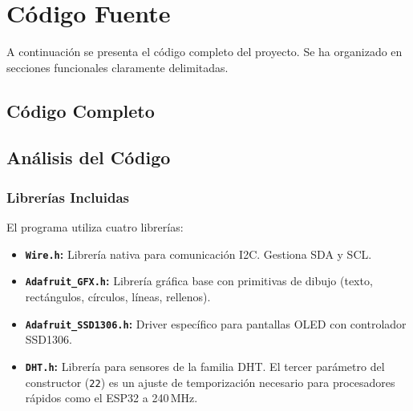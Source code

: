 \documentclass[12pt,a4paper]{article}
\begin{document}
\section{Código Fuente}

A continuación se presenta el código completo del proyecto. Se ha organizado en secciones funcionales claramente delimitadas.

\subsection{Código Completo}


\subsection{Análisis del Código}

\subsubsection*{Librerías Incluidas}
El programa utiliza cuatro librerías:
\begin{itemize}
    \item \textbf{\texttt{Wire.h}:} Librería nativa para comunicación I2C. Gestiona SDA y SCL.
    \item \textbf{\texttt{Adafruit\_GFX.h}:} Librería gráfica base con primitivas de dibujo (texto, rectángulos, círculos, líneas, rellenos).
    \item \textbf{\texttt{Adafruit\_SSD1306.h}:} Driver específico para pantallas OLED con controlador SSD1306.
    \item \textbf{\texttt{DHT.h}:} Librería para sensores de la familia DHT. El tercer parámetro del constructor (\texttt{22}) es un ajuste de temporización necesario para procesadores rápidos como el ESP32 a 240\,MHz.
\end{itemize}
\end{document}
